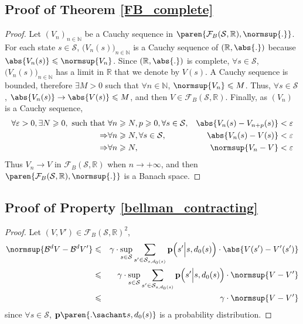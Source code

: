 \subsection{Proof of Theorem \ref{FB_complete}}
\label{FB_complete_RETURN}
\begin{proof} 
Let $(V_n)_{n \in \mathbb{N}}$ be a Cauchy sequence 
in $\paren{ \mathcal{F}_{B}(\mathcal{S},\mathbb{R}), \normsup{.}}$. 
For each state $s \in \mathcal{S}$, 
$\Big(V_n(s)\Big)_{n \in \mathbb{N}}$
is a Cauchy sequence of $(\mathbb{R},\abs{.})$
because $\abs{V_n(s)} \leqslant \normsup{V_n}$. 
Since $(\mathbb{R},\abs{.})$ is complete, 
$\forall s \in \mathcal{S}$, $\Big(V_n(s)\Big)_{n \in \mathbb{N}}$ 
has a limit in $\mathbb{R}$
that we denote by $V(s)$. 
A Cauchy sequence is bounded, 
therefore $\exists M>0$ 
such that $\forall n \in \mathbb{N}$, 
$\normsup{V_n} \leqslant M $. 
Thus, $\forall s \in \mathcal{S}$, 
$\abs{ V_n(s) } \rightarrow \abs{ V(s) } \leqslant M$, 
and then $V \in \mathcal{F}_{B}(\mathcal{S},\mathbb{R})$.
Finally, as $(V_n)$ is a Cauchy sequence,
\begin{eqnarray*}
\forall \varepsilon >0, \exists N \geqslant 0, \mbox{ such that } &  \forall n \geqslant N,p \geqslant 0,  \forall s \in \mathcal{S}, & \abs{ V_n(s) - V_{n+p}(s) } < \varepsilon \\
\Rightarrow & \forall n \geqslant N, \forall s \in \mathcal{S}, & \abs{ V_n(s) - V(s) } < \varepsilon \\
\Rightarrow & \forall n \geqslant N, & \normsup{V_n - V} < \varepsilon 
\end{eqnarray*}
Thus $V_n \longrightarrow V$ in $\mathcal{F}_{B}(\mathcal{S},\mathbb{R})$ 
when $n \rightarrow + \infty$, 
and then $\paren{\mathcal{F}_{B}(\mathcal{S},\mathbb{R}),\normsup{.}}$ is a Banach space.
\end{proof}



\subsection{Proof of Property \ref{bellman_contracting}}
\label{bellman_contracting_RETURN}
\begin{proof}
Let $(V,V') \in \mathcal{F}_{B} (\mathcal{S},\mathbb{R})^2$,
\begin{eqnarray*}
\normsup{\mathcal{B}^d V - \mathcal{B}^d V'} & \leqslant &  \gamma \cdot \sup_{s \in \mathcal{S}} \sum_{s' \in \mathcal{S}_{s,d_0(s)}} \textbf{p} \Big( s' \Big\vert s,d_0(s) \Big) \cdot \abs{ V(s')-V'(s')} \\
& \leqslant &  \gamma \cdot \sup_{s \in \mathcal{S}} \sum_{s' \in \mathcal{S}_{s,d_0(s)}} \textbf{p} \Big(s' \Big\vert s,d_0(s) \Big) \cdot \normsup{ V-V'} \\ 
& \leqslant &  \gamma \cdot \normsup{ V-V'} 
\end{eqnarray*}
since $\forall s \in \mathcal{S}$, $\textbf{p} \paren{. \sachant s,d_0(s)}$
is a probability distribution.
\end{proof}



